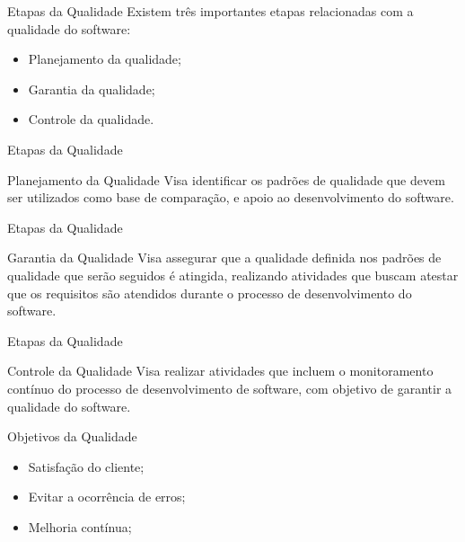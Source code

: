 \documentclass[xcolor=x11names,compress]{beamer}
\begin{document}
\begin{frame}{Etapas da Qualidade}
Existem três importantes etapas relacionadas com a qualidade do software:

\begin{itemize}
\itemsep 5mm

\item Planejamento da qualidade;

\item Garantia da qualidade;

\item Controle da qualidade.

\end{itemize}

\end{frame}

\begin{frame}{Etapas da Qualidade}

\begin{alertblock}{Planejamento da Qualidade}
Visa identificar os padrões de qualidade que devem ser utilizados como base de comparação, e apoio ao desenvolvimento do software.
\end{alertblock}

\end{frame}

\begin{frame}{Etapas da Qualidade}

\begin{alertblock}{Garantia da Qualidade}
Visa assegurar que a qualidade definida nos padrões de qualidade que serão seguidos é atingida, realizando atividades que buscam atestar que os requisitos são atendidos durante o processo de desenvolvimento do software.
\end{alertblock}

\end{frame}

\begin{frame}{Etapas da Qualidade}

\begin{alertblock}{Controle da Qualidade}
Visa realizar atividades que incluem o monitoramento contínuo do processo de desenvolvimento de software, com objetivo de garantir a qualidade do software.  
\end{alertblock}

\end{frame}

\begin{frame}{Objetivos da Qualidade}

\begin{itemize}
\itemsep 5mm

\item Satisfação do cliente;

\item Evitar a ocorrência de erros;

\item Melhoria contínua;

\end{itemize}

\end{frame}
\end{document}
